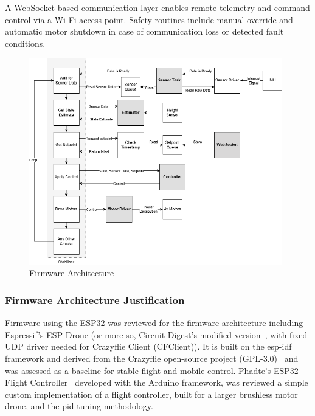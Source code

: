 A WebSocket-based communication layer enables remote telemetry and command control via a Wi-Fi access point. Safety routines include manual override and automatic motor shutdown in case of communication loss or detected fault conditions.

\begin{figure}[H]
    \centering
    \captionsetup{justification=centering, margin=1cm}
    \includegraphics[width=0.98\textwidth]{img/block-software-gray2.PNG}
    \caption{Firmware Architecture}
    \label{fig:block-software}
\end{figure}

\subsubsection{Firmware Architecture Justification}

Firmware using the ESP32 was reviewed for the firmware architecture including Espressif’s ESP-Drone (or more so, Circuit Digest’s modified version~\cite{espdrone_circuitdigest}, with fixed UDP driver needed for Crazyflie Client (CFClient)). It is built on the \gls{esp-idf} framework and derived from the Crazyflie open-source project (GPL-3.0)~\cite{bitcraze_crazyflie_firmware} and was assessed as a baseline for stable flight and mobile control. Phadte’s ESP32 Flight Controller~\cite{pratikphadte_flight_controller} developed with the Arduino framework, was reviewed a simple custom implementation of a flight controller, built for a larger brushless motor drone, and the \gls{pid} tuning methodology.  

